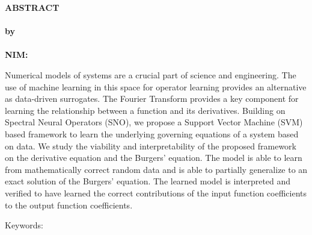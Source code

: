 \clearpage
{}
{}
\begin{center}
\textbf{\large  ABSTRACT}\\[0.5cm]
\textbf{\large \judulcapitalized}\\[0.5cm]
\textbf{by}\\
\textbf{\penulis}\\
\textbf{NIM:\@\nim}\\[2em]
\end{center}

\noindent Numerical models of systems are a crucial part of science and engineering. The use of machine learning in this space for operator learning provides an alternative as data-driven surrogates. The Fourier Transform provides a key component for learning the relationship between a function and its derivatives. Building on Spectral Neural Operators (SNO), we propose a Support Vector Machine (SVM) based framework to learn the underlying governing equations of a system based on data. We study the viability and interpretability of the proposed framework on the derivative equation and the Burgers' equation. The model is able to learn from mathematically correct random data and is able to partially generalize to an exact solution of the Burgers' equation. The learned model is interpreted and verified to have learned the correct contributions of the input function coefficients to the output function coefficients.

\noindent Keywords: \keywords{}